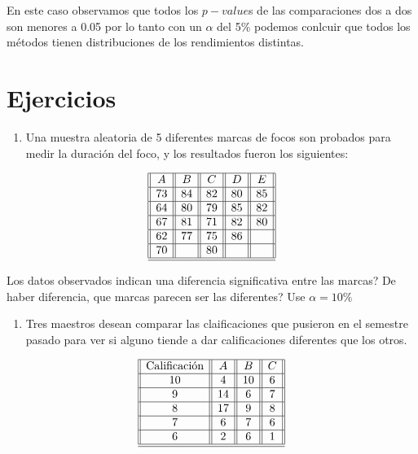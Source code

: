 \documentclass[
  a4paper,
  oneside,
  openany]{book}
\providecommand{\tightlist}{%
  \setlength{\itemsep}{0pt}\setlength{\parskip}{0pt}}
\begin{document}
En este caso observamos que todos los \(p-value\)s de las comparaciones dos a dos son menores a 0.05 por lo tanto con un \(\alpha\) del 5\% podemos conlcuir que todos los métodos tienen distribuciones de los rendimientos distintas.

\hypertarget{ejercicios-3}{%
\section{Ejercicios}\label{ejercicios-3}}

\begin{enumerate}
\def\labelenumi{\arabic{enumi}.}
\tightlist
\item
  Una muestra aleatoria de 5 diferentes marcas de focos son probados para medir la duración del foco, y los resultados fueron los siguientes:
\end{enumerate}

\[
\begin{array}{||c| |c| |c| |c||c||} 
\hline 
A & B&C&D&E \\ 
 \hline
73&84&82&80&85\\
 \hline
64&80&79&85&82\\
 \hline
67&81&71&82&80\\
 \hline
62&77&75&86&\\
 \hline
70&&80&&\\
\hline
\hline
\end{array}
\]

Los datos observados indican una diferencia significativa entre las marcas? De haber diferencia, que marcas parecen ser las diferentes? Use \(\alpha=10\%\)

\begin{enumerate}
\def\labelenumi{\arabic{enumi}.}
\setcounter{enumi}{1}
\tightlist
\item
  Tres maestros desean comparar las claificaciones que pusieron en el semestre pasado para ver si alguno tiende a dar calificaciones diferentes que los otros.
\end{enumerate}

\[
\begin{array}{||c| |c| |c| |c||} 
\hline 
\mbox{Calificación} & A & B&C \\  
 \hline
10&4&10&6\\
 \hline
9&14&6&7\\
 \hline
8&17&9&8\\
 \hline
7&6&7&6\\
 \hline
6&2&6&1\\
\hline
\hline
\end{array}
\]
\end{document}
